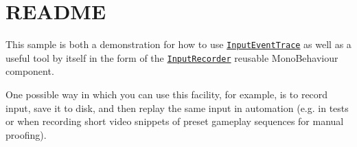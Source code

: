 \chapter{README}
\hypertarget{md__hey_tea_9_2_library_2_package_cache_2com_8unity_8inputsystem_0d1_86_83_2_samples_0i_2_input_recorder_2_r_e_a_d_m_e}{}\label{md__hey_tea_9_2_library_2_package_cache_2com_8unity_8inputsystem_0d1_86_83_2_samples_0i_2_input_recorder_2_r_e_a_d_m_e}
This sample is both a demonstration for how to use \href{https://docs.unity3d.com/Packages/com.unity.inputsystem@latest/index.html?subfolder=/api/UnityEngine.InputSystem.LowLevel.InputEventTrace.html}{\texttt{ {\ttfamily Input\+Event\+Trace}}} as well as a useful tool by itself in the form of the \href{./InputRecorder.cs}{\texttt{ {\ttfamily Input\+Recorder}}} reusable {\ttfamily Mono\+Behaviour} component.

One possible way in which you can use this facility, for example, is to record input, save it to disk, and then replay the same input in automation (e.\+g. in tests or when recording short video snippets of preset gameplay sequences for manual proofing). 